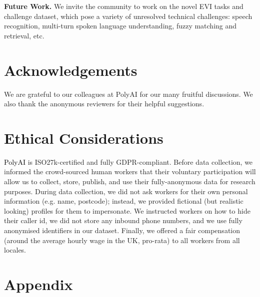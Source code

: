 \documentclass[11pt]{article}
\newcommand{\rparagraph}[1]{\vspace{1.4mm}\noindent\textbf{#1.}}
\begin{document}
{\rparagraph{Future Work} We invite the community to work on the novel EVI tasks and challenge dataset, which pose a variety of unresolved technical challenges:
speech recognition, multi-turn spoken language understanding, fuzzy matching and retrieval, etc.




 

\section*{Acknowledgements}
We are grateful to our colleagues at PolyAI for our many fruitful discussions.
We also thank the anonymous reviewers for their helpful suggestions.


\section*{Ethical Considerations}
\textcolor{black}{PolyAI} is ISO27k-certified and fully GDPR-compliant.
Before data collection,
we informed the crowd-sourced human workers that
their voluntary participation will allow us to
collect, store, publish, and use their fully-anonymous data for research purposes.
During data collection,
we did not ask workers for their own personal information (e.g. name, postcode);
instead, we provided fictional (but realistic looking) profiles for them to impersonate.
We instructed workers on how to hide their caller id,
we did not store any inbound phone numbers,
and we use fully anonymised identifiers in our dataset.
Finally,
we offered a fair compensation
(around the average hourly wage in the UK, pro-rata)
to all workers from all locales.


\appendix


\renewcommand{\thesection}{\Alph{section}}


\section{Appendix}
\label{sec:appendix-qs}

}
\end{document}
